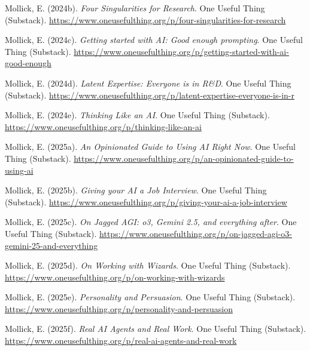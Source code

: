 \documentclass[
  letterpaper,
  11pt]{scrbook}
\newlength{\cslhangindent}
\newenvironment{CSLReferences}[2] %
 {\begin{list}{}{%
  \setlength{\itemindent}{0pt}
  \setlength{\leftmargin}{0pt}
  \setlength{\parsep}{0pt}
  \ifodd #1
   \setlength{\leftmargin}{\cslhangindent}
   \setlength{\itemindent}{-1\cslhangindent}
  \fi
  \setlength{\itemsep}{#2\baselineskip}}}
 {\end{list}}
\begin{document}
\begin{CSLReferences}{1}{0}
Mollick, E. (2024b). \emph{{Four Singularities for Research}}. One
Useful Thing (Substack).
\url{https://www.oneusefulthing.org/p/four-singularities-for-research}

Mollick, E. (2024c). \emph{{Getting started with AI: Good enough
prompting}}. One Useful Thing (Substack).
\url{https://www.oneusefulthing.org/p/getting-started-with-ai-good-enough}

Mollick, E. (2024d). \emph{{Latent Expertise: Everyone is in R{\&}D}}.
One Useful Thing (Substack).
\url{https://www.oneusefulthing.org/p/latent-expertise-everyone-is-in-r}

Mollick, E. (2024e). \emph{{Thinking Like an AI}}. One Useful Thing
(Substack). \url{https://www.oneusefulthing.org/p/thinking-like-an-ai}

Mollick, E. (2025a). \emph{{An Opinionated Guide to Using AI Right
Now}}. One Useful Thing (Substack).
\url{https://www.oneusefulthing.org/p/an-opinionated-guide-to-using-ai}

Mollick, E. (2025b). \emph{{Giving your AI a Job Interview}}. One Useful
Thing (Substack).
\url{https://www.oneusefulthing.org/p/giving-your-ai-a-job-interview}

Mollick, E. (2025c). \emph{{On Jagged AGI: o3, Gemini 2.5, and
everything after}}. One Useful Thing (Substack).
\url{https://www.oneusefulthing.org/p/on-jagged-agi-o3-gemini-25-and-everything}

Mollick, E. (2025d). \emph{{On Working with Wizards}}. One Useful Thing
(Substack).
\url{https://www.oneusefulthing.org/p/on-working-with-wizards}

Mollick, E. (2025e). \emph{{Personality and Persuasion}}. One Useful
Thing (Substack).
\url{https://www.oneusefulthing.org/p/personality-and-persuasion}

Mollick, E. (2025f). \emph{{Real AI Agents and Real Work}}. One Useful
Thing (Substack).
\url{https://www.oneusefulthing.org/p/real-ai-agents-and-real-work}


\end{CSLReferences}
\end{document}
